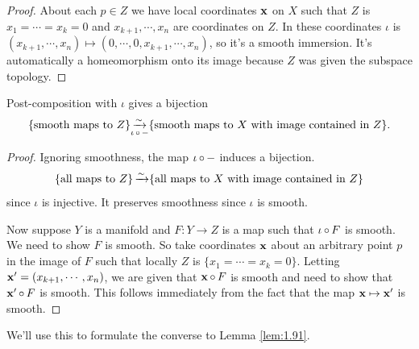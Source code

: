 \documentclass[a4paper,11pt]{article}
\begin{document}
	\begin{proof}
		About each $p \in Z$ we have local coordinates $\vb x$ on $X$ such that $Z$ is $x_1 = \cdots = x_k = 0$ and $x _{k+1}, \cdots, x_n$ are coordinates on $Z$. In these coordinates $\iota$ is $(x _{k+1}, \cdots, x_n) \mapsto (0,\cdots,0,x _{k+1},\cdots,x_n)$, so it's a smooth immersion. It's automatically a homeomorphism onto its image because $Z$ was given the subspace topology.
	\end{proof}

	\begin{lem}
		Post-composition with $\iota$ gives a bijection
		\[
			\{\text{smooth maps to }Z\} \underset{\iota \operatorname{\circ} -}{\operatorname{\xrightarrow{\sim}}} \{\text{smooth maps to $X$ with image contained in $Z$}\}.
		\]
		\label{lem:1.92}
	\end{lem}
	\begin{proof}
		Ignoring smoothness, the map $\iota \operatorname{\circ} -$ induces a bijection.
		\[
			\{\text{all maps to }Z\} \operatorname{\xrightarrow{\sim}} \{\text{all maps to $X$ with image contained in $Z$}\}
		\]
		since $\iota$ is injective. It preserves smoothness since $\iota$ is smooth.

		Now suppose $Y$ is a manifold and $F : Y \to Z$ is a map such that $\iota \operatorname{\circ} F$ is smooth. We need to show $F$ is smooth. So take coordinates $\vb x$ about an arbitrary point $p$ in the image of $F$ such that locally $Z$ is $\{x_1 = \cdots = x_k = 0\}$. Letting $\vb x' = (x _{k+1}, \cdots, x_n)$, we are given that $\vb x \operatorname{\circ} F$ is smooth and need to show that $\vb x' \operatorname{\circ} F$ is smooth. This follows immediately from the fact that the map $\vb x \mapsto \vb x'$ is smooth.
	\end{proof}

	We'll use this to formulate the converse to Lemma \ref{lem:1.91}.
\end{document}
